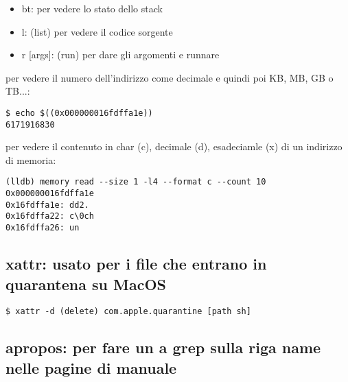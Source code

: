 \begin{itemize}
        rbp: base dello stack frame

        rsp e rbp salgono quando lo stack frame viene rilasciato


        rip: registro di instruction pointer e dice quale istruzione sara1 eseguita e sara1 un valore basso se punta ad un istruzione che sta nel text invece altro se si trova in una libreria


        (lldb) disassemble: fa vedere il codice eseguibile in assembly delle funzoine che sto eseguendo. indica con -> la prossima istruzione che sta per essere eseguita


        sara1 possibile eseguire le chiamata in codice assembly una alla volta tramite:

        (lldb) register read [nome registro]

        per eseguire una sola istruzione usiamo 

        (lldb) si

    \item bt: per vedere lo stato dello stack
    \item l: (list) per vedere il codice sorgente
    \item r [args]: (run) per dare gli argomenti e runnare
\end{itemize}

per vedere il numero dell'indirizzo come decimale e quindi poi KB, MB, GB o TB...:
\begin{lstlisting}
$ echo $((0x000000016fdffa1e))
6171916830
\end{lstlisting}

per vedere il contenuto in char (c), decimale (d), esadeciamle (x) di un indirizzo di memoria:
\begin{lstlisting}
(lldb) memory read --size 1 -l4 --format c --count 10 0x000000016fdffa1e
0x16fdffa1e: dd2.
0x16fdffa22: c\0ch
0x16fdffa26: un
\end{lstlisting}


\subsection{xattr: usato per i file che entrano in quarantena su MacOS}

\begin{lstlisting}
$ xattr -d (delete) com.apple.quarantine [path sh]
\end{lstlisting}


\subsection{apropos: per fare un a grep sulla riga name nelle pagine di manuale}

